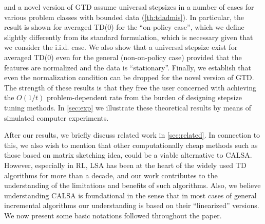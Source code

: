 \begin{enumerate}[topsep=0pt,itemsep=1pt,wide, labelwidth=!, labelindent=0pt,label=\emph{\arabic*}.]
and a novel version of GTD assume universal stepsizes in a number of cases 
for various problem classes with bounded data (\cref{th:tdadmis}).
In particular, the result is shown for averaged TD($0$) for the ``on-policy case'', which we define
slightly differently from its standard formulation, which is necessary given that we consider the i.i.d. case. We also show that a universal stepsize exist for averaged TD($0$) 
even for the general (non-on-policy case) provided that 
the features are normalized and the data is ``stationary''. 
Finally, we establish that even the normalization condition can be dropped for the novel version of GTD. The strength of these results is that they free the user 
concerned with achieving the $O(1/t)$ problem-dependent rate from the burden of 
designing stepsize tuning methods.
In \cref{sec:exp} we illustrate these theoretical results by means of simulated computer
experiments.
\end{enumerate}%
After our results, we briefly discuss related work in \cref{sec:related}.
In connection to this, we also wish to mention
that other computationally cheap methods such as those based on matrix sketching idea, could be a viable alternative to  CALSA. 
However, especially in RL, LSA has been at the heart of the widely used TD algorithms for more than a decade, and our work contributes to the understanding of the limitations and benefits of such algorithms. Also, we believe understanding CALSA is foundational in the sense that in most cases of general incremental algorithms our understanding is based on their ``linearized'' versions. We now present some basic notations followed throughout the paper.

